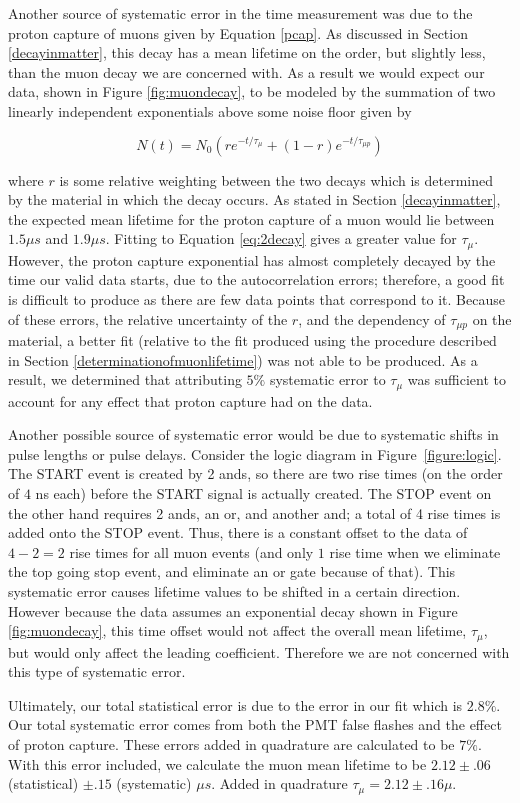 Another source of systematic error in the time measurement was due to the proton capture of muons given by Equation \eqref{pcap}.  As discussed in Section \ref{decayinmatter}, this decay has a mean lifetime on the order, but slightly less, than the muon decay we are concerned with.  As a result we would expect our data, shown in Figure \ref{fig:muondecay}, to be modeled by the summation of two linearly independent exponentials above some noise floor given by

\begin{center}
\begin{equation}
\label{eq:2decay}
N(t)=N_{0}(r e^{-t/\tau_{\mu}}+(1-r)e^{-t/\tau_{\mu p}})
\end{equation}
\end{center}

where $r$ is some relative weighting between the two decays which is determined by the material in which the decay occurs.  As stated in Section \ref{decayinmatter}, the expected mean lifetime for the proton capture of a muon would lie between $1.5 \mu s$ and $1.9 \mu s$.  Fitting to Equation \eqref{eq:2decay} gives a greater value for $\tau_{\mu}$. However, the proton capture exponential has almost completely decayed by the time our valid data starts, due to the autocorrelation errors; therefore, a good fit is difficult to produce as there are few data points that correspond to it. Because of these errors, the relative uncertainty of the $r$, and the dependency of $\tau_{\mu p}$ on the material, a better fit (relative to the fit produced using the procedure described in Section \ref{determinationofmuonlifetime}) was not able to be produced. As a result, we determined that attributing $5\%$ systematic error to $\tau_{\mu}$ was sufficient to account for any effect that proton capture had on the data. 

Another possible source of systematic error would be due to systematic shifts in pulse lengths or pulse delays. Consider the logic diagram in Figure~\ref{figure:logic}. The START event is created by 2 ands, so there are two rise times (on the order of $4$ ns each) before the START signal is actually created. The STOP event on the other hand requires 2 ands, an or, and another and; a total of 4 rise times is added onto the STOP event. Thus, there is a constant offset to the data of $4-2=2$ rise times for all muon events (and only $1$ rise time when we eliminate the top going stop event, and eliminate an or gate because of that). This systematic error causes lifetime values to be shifted in a certain direction.  However because the data assumes an exponential decay shown in Figure \ref{fig:muondecay}, this time offset would not affect the overall mean lifetime, $\tau_{\mu}$, but would only affect the leading coefficient. Therefore we are not concerned with this type of systematic error.

Ultimately, our total statistical error is due to the error in our fit which is $2.8\%$.  Our total systematic error comes from both the PMT false flashes and the effect of proton capture.  These errors added in quadrature are calculated to be $7\%$.  With this error included, we calculate the muon mean lifetime to be $2.12\pm.06$ (statistical) $\pm.15$ (systematic) $\mu s$.  Added in quadrature $\tau_{\mu}=2.12\pm.16\mu$.
